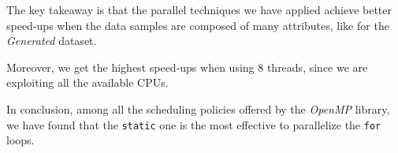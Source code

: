 \documentclass{article}
\begin{document}
The key takeaway is that the parallel techniques we have applied achieve better speed-ups when
the data samples are composed of many attributes, like for the \textit{Generated} dataset.

Moreover, we get the highest speed-ups when using 8 threads, since we are exploiting all the
available CPUs.

In conclusion, among all the scheduling policies offered by the \textit{OpenMP} library, we have
found that the \texttt{static} one is the most effective to parallelize the \texttt{for} loops.
\vspace{-6pt}



\newlength{\graphShift}
\newlength{\axesLineWidth}
\newlength{\gridLineWidth}
\newlength{\graphLineWidth}
\setlength{\graphShift}{0mm}
\setlength{\axesLineWidth}{2pt}
\setlength{\gridLineWidth}{1pt}
\setlength{\graphLineWidth}{2pt}



\end{document}
